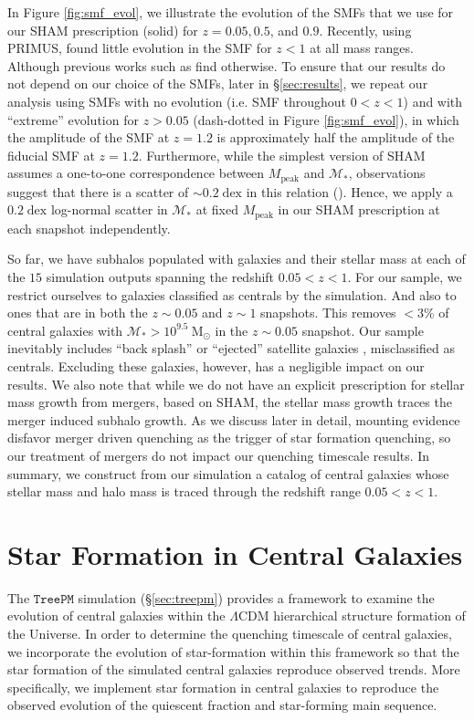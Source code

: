 In Figure \ref{fig:smf_evol}, 
we illustrate the evolution of the SMFs that we use for our 
SHAM prescription (solid) for $z = 0.05, 0.5$, and $0.9$.
Recently, using PRIMUS, \cite{Moustakas:2013aa} found little 
evolution in the SMF for $z < 1$ at all mass ranges. Although 
previous works such as \cite{Bundy:2006aa} find otherwise. 
To ensure that our results do not depend on our choice of the SMFs, 
later in \S \ref{sec:results}, we repeat our analysis using 
SMFs with no evolution (i.e. \citealt{Li:2009aa} SMF throughout $0< z <1$)
and with ``extreme'' evolution for $z > 0.05$ (dash-dotted in Figure 
\ref{fig:smf_evol}), in which the amplitude of the SMF at $z = 1.2$ 
is approximately half the amplitude of the fiducial SMF at $z = 1.2$.
Furthermore, while the simplest version of SHAM assumes a one-to-one 
correspondence between $M_\mathrm{peak}$ and $\mathcal{M}_*$, observations 
suggest that there is a scatter of $\sim 0.2\;\mathrm{dex}$
in this relation (\citealt{Zheng:2007aa, Yang:2008aa, More:2009aa, Gu:2016aa}).
Hence, we apply a $0.2\;\mathrm{dex}$ log-normal scatter in $\mathcal{M}_*$ 
at fixed $M_\mathrm{peak}$ in our SHAM prescription at each snapshot 
independently. 

So far, we have subhalos populated with galaxies and their 
stellar mass at each of the $15$ simulation outputs spanning 
the redshift $0.05 < z < 1$. 
For our sample, we restrict ourselves to galaxies classified 
as centrals by the simulation. And also to ones that are in 
both the $z\sim 0.05$ and $z\sim 1$ snapshots. This removes 
$< 3\%$ of central galaxies with $\mathcal{M}_* > 10^{9.5}~\mathrm{M}_\odot$ 
in the $z \sim 0.05$ snapshot. Our sample inevitably includes ``back splash'' 
or ``ejected'' satellite galaxies \citep{Wetzel:2014aa}, misclassified 
as centrals. Excluding these galaxies, however, has a negligible 
impact on our results. We also note that while we do not have 
an explicit prescription for stellar mass growth from mergers, 
based on SHAM, the stellar mass growth traces the merger induced 
subhalo growth. As we discuss later in detail, mounting evidence 
disfavor merger driven quenching as the trigger of star formation 
quenching, so our treatment of mergers do not impact our quenching
timescale results. In summary, we construct from our simulation 
a catalog of central galaxies whose stellar mass and halo mass is traced through the redshift range $0.05 < z < 1$.

\section{Star Formation in Central Galaxies} \label{sec:model}
The $\mathtt{TreePM}$ simulation (\S \ref{sec:treepm}) provides a framework to examine 
the evolution of central galaxies within the $\Lambda$CDM hierarchical 
structure formation 
of the Universe. In order to determine the quenching timescale of central galaxies, 
we incorporate the evolution of star-formation within this framework so that 
the star formation of the simulated central galaxies reproduce observed trends. 
More specifically, we implement star formation in central galaxies to reproduce
the observed evolution of the quiescent fraction and star-forming main sequence. 

